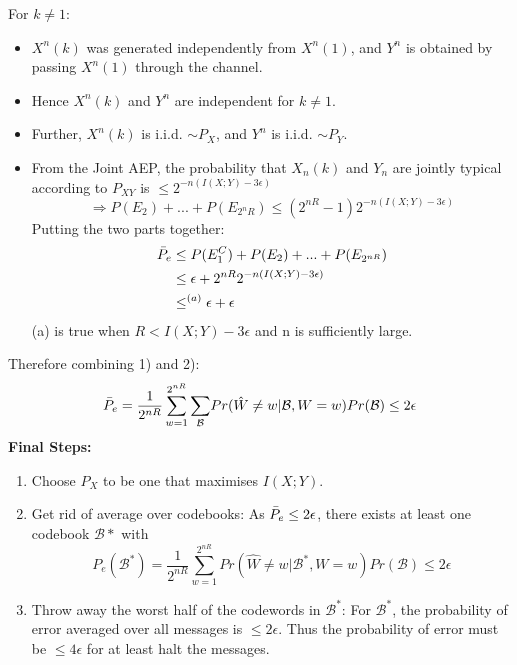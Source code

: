 \documentclass[12pt]{article}
\begin{document}
For $k\not = 1$:
\begin{itemize}
    \item $X^n(k)$ was generated independently from $X^n(1)$, and $Y^n$ is obtained by passing $X^n(1)$ through the channel. 
    \item Hence $X^n(k)$ and $Y^n$ are independent for $k \not = 1$.
    \item Further, $X^n(k)$ is i.i.d. $\sim P_X$, and $Y^n$ is i.i.d. $\sim P_Y$.
    \item From the Joint AEP, the probability that $X_n(k)$ and $Y_n$ are jointly typical according to $P_{XY}$ is $\le 2^{-n(I(X;Y)-3\epsilon)}$
    \[
    \Rightarrow P(E_2)+...+ P(E_{2^nR}) \le (2^{nR}-1)2^{-n(I(X;Y)-3\epsilon)}
    \]
    Putting the two parts together:
    \begin{align*}
        \Bar{P}_e &\le P(E_1^C) + P(E_2) +...+ P(E_{2^{nR}})\\
        &\le \epsilon + 2^{nR}2^{-n(I(X;Y)-3\epsilon)} \\
        &\le^{(a)} \epsilon + \epsilon
    \end{align*}
    (a) is true when $R<I(X;Y)-3\epsilon$ and n is sufficiently large.
    \end{itemize}
Therefore combining 1) and 2):
\[
\Bar{P}_e = \frac{1}{2^{nR}} \sum_{w=1}^{2^{nR}} {\sum_{\mathcal{B}}} Pr(\hat{W}\not = w |\mathcal{B}, W=w){Pr(\mathcal{B})} \le 2\epsilon 
\]
{\Large \textbf{Final Steps:}}
\begin{enumerate}
    \item Choose $P_X$ to be one that maximises $I(X;Y)$.
    \item Get rid of average over codebooks:  As $\Bar{P}_e \le 2\epsilon$, there exists at least one codebook $\mathcal{B}*$ with
    \[
    P_e(\mathcal{B}^*) = \frac{1}{2^{nR}} \sum_{w=1}^{2^{nR}} Pr(\hat{W}\not = w |\mathcal{B}^*, W=w){Pr(\mathcal{B})} \le 2\epsilon 
    \]
    \item Throw away the worst half of the codewords in $\mathcal{B}^*$: For $\mathcal{B}^*$, the probability of error averaged over all messages is $\le 2\epsilon$. Thus the probability of error must be $\le 4\epsilon$ for at least halt the messages.
\end{enumerate}
    
\end{document}
